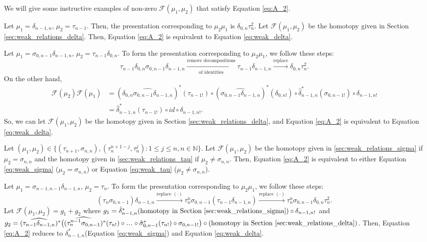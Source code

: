 We will give some instructive examples 
of non-zero $\mathcal{F}(\mu_1, \mu_2)$ that satisfy Equation 
\ref{eq:A_2}.
\begin{eg}
Let $\mu_1 = \delta_{n-1,n}$, $\mu_2 = 
\tau_{n-1}$. Then, the presentation 
corresponding to $\mu_2\mu_1$ is 
$\delta_{0,n}\tau_n^2$. Let 
$\mathcal{F}(\mu_1, \mu_2)$ be the homotopy given 
in Section \ref{sec:weak_relations_delta}. 
Then, Equation \ref{eq:A_2} 
is equivalent to Equation \ref{eq:weak_delta}.
\end{eg}
%
\begin{eg}
Let $\mu_1 = \sigma_{0,n-1} \delta_{n-1,n}$, 
$\mu_2 = \tau_{n-1} \delta_{0,n}$. To 
form the presentation corresponding to 
$\mu_2\mu_1$, we follow these steps: 
$$
\tau_{n-1} \delta_{0,n} \sigma_{0,n-1} 
\delta_{n-1,n} 
\xrightarrow[\textrm{of identities}]{\textrm{remove decompositions}}
\tau_{n-1} \delta_{n-1,n}
\xrightarrow{\textrm{replace}}
\delta_{0,n}\tau_n^2.
$$
On the other hand, 
\begin{align*}
\mathcal{F}(\mu_2)\mathcal{F}(\mu_1) 
&= 
(\widehat{\delta_{0,n}\sigma_{0,n-1}
  \delta_{n-1,n}})^*(\tau_{n-1!}) \circ
  (\widehat{\sigma_{0,n-1}\delta_{n-1,n}})^*
  (\delta_{0,n!}) \circ 
  \hat{\delta}_{n-1,n}^*(\sigma_{0,n-1!}) 
  \circ \delta_{n-1,n!}\\
&= 
\hat{\delta}_{n-1,n}^*(\tau_{n-1!}) \circ
  id \circ \delta_{n-1,n!}.
\end{align*}
So, we can let $\mathcal{F}(\mu_1, \mu_2)$ be the 
homotopy given in Section 
\ref{sec:weak_relations_delta}, and Equation 
\ref{eq:A_2} is equivalent to Equation 
\ref{eq:weak_delta}.
\end{eg}
%
\begin{eg}
Let $(\mu_1, \mu_2) \in \{ (\tau_{n+1}, 
\sigma_{n,n}), (\tau_{n}^{n+1-j}, 
\tau_n^j): 1\leq j \leq n, n \in \mathbb{N}
\}$. Let $\mathcal{F}(\mu_1, \mu_2)$ be 
the homotopy given in 
\ref{sec:weak_relations_sigma} if $\mu_2 = 
\sigma_{n,n}$ and the homotopy given in 
\ref{sec:weak_relations_tau} if $\mu_2 \neq 
\sigma_{n,n}$. Then, Equation \ref{eq:A_2} 
is equivalent to either Equation 
\ref{eq:weak_sigma} ($\mu_2 = 
\sigma_{n,n}$) or Equation \ref{eq:weak_tau} 
($\mu_2 \neq \sigma_{n,n}$).
\end{eg}
%
\begin{eg}
Let $\mu_1 = \sigma_{n-1,n-1} \delta_{n-1,n}$, 
$\mu_2 = \tau_n$. To 
form the presentation corresponding to 
$\mu_2\mu_1$, we follow these steps: 
$$
(\tau_n \sigma_{0,n-1}) 
\delta_{n-1,n} 
\xrightarrow{\textrm{replace $(\cdot)$}}
\tau_n^n \sigma_{0,n-1}(\tau_{n-1}\delta_{n-1,n})
\xrightarrow{\textrm{replace $(\cdot)$}}
\tau_n^n \sigma_{0,n-1}\delta_{0,n}\tau_n^2.
$$
Let $\mathcal{F}(\mu_1, \mu_2) = g_1 + g_2$ where 
$g_1 = \hat{\delta}_{n-1,n}^*( 
\textrm{homotopy in Section 
\ref{sec:weak_relations_sigma}})\circ
\delta_{n-1,n!}$ and $g_2 = 
(\widehat{\tau_{n-1}\delta_{n-1,n}})^*\big(
(\widehat{\tau_n^{n-1}\sigma_{0,n-1}})^*
  (\tau_{n!}) \circ \smdots \circ 
  \hat{\sigma}_{0,n-1}^*(\tau_{n!}) \circ 
  \sigma_{0,n-1!} \big) \circ 
\textrm{(homotopy in Section 
\ref{sec:weak_relations_delta})}$. 
Then, Equation \ref{eq:A_2} 
reduces to $\delta_{n-1,n}^*$(Equation 
\ref{eq:weak_sigma}) and Equation 
\ref{eq:weak_delta}.
\end{eg}
%